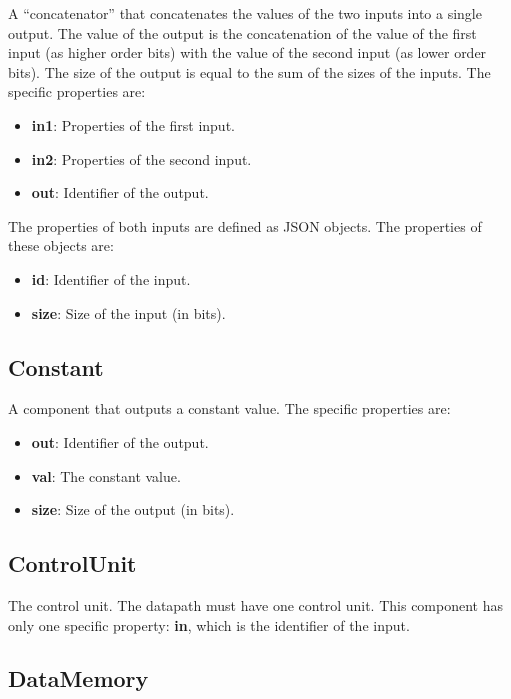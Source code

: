 \documentclass[11pt,a4paper,twoside,titlepage]{report}
\begin{document}
A ``concatenator'' that concatenates the values of the two inputs into a single output.
The value of the output is the concatenation of the value of the first input (as higher
order bits) with the value of the second input (as lower order bits).
The size of the output is equal to the sum of the sizes of the inputs.
The specific properties are:
\begin{itemize}
	\item \textbf{in1}: Properties of the first input.
	\item \textbf{in2}: Properties of the second input.
	\item \textbf{out}: Identifier of the output.
\end{itemize}

The properties of both inputs are defined as JSON objects. The properties of these
objects are:
\begin{itemize}
	\item \textbf{id}: Identifier of the input.
	\item \textbf{size}: Size of the input (in bits).
\end{itemize}

\subsection{Constant}

A component that outputs a constant value. The specific properties are:
\begin{itemize}
	\item \textbf{out}: Identifier of the output.
	\item \textbf{val}: The constant value.
	\item \textbf{size}: Size of the output (in bits).
\end{itemize}

\subsection{ControlUnit}

The control unit. The datapath must have one control unit.
This component has only one specific property: \textbf{in}, which is
the identifier of the input.

\subsection{DataMemory}
\end{document}
